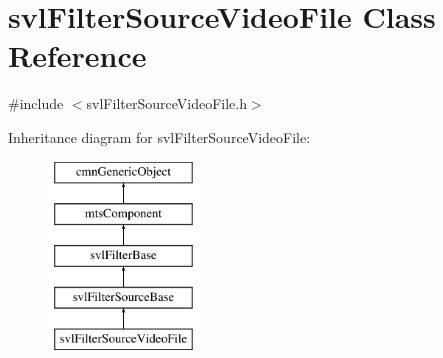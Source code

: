 \hypertarget{classsvl_filter_source_video_file}{\section{svl\-Filter\-Source\-Video\-File Class Reference}
\label{classsvl_filter_source_video_file}
}


{\ttfamily \#include $<$svl\-Filter\-Source\-Video\-File.\-h$>$}

Inheritance diagram for svl\-Filter\-Source\-Video\-File\-:\begin{figure}[H]
\begin{center}
\leavevmode
\includegraphics[height=5.000000cm]{d9/d4f/classsvl_filter_source_video_file}
\end{center}
\end{figure}
